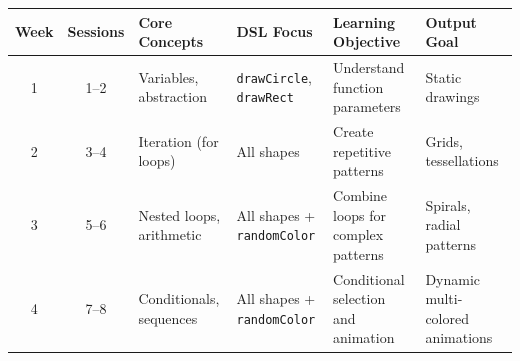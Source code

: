 \begin{table}
\centering

\begin{tabular}{@{}c c m{3cm} m{3cm} m{4cm} m{3.5cm}@{}}
\toprule
\textbf{Week} & \textbf{Sessions} & \textbf{Core Concepts} & \textbf{DSL Focus} & \textbf{Learning Objective} & \textbf{Output Goal} \\
\midrule
1 & 1--2 & Variables, abstraction & \texttt{drawCircle}, \texttt{drawRect} & Understand function parameters & Static drawings \\
2 & 3--4 & Iteration (for loops) & All shapes & Create repetitive patterns & Grids, tessellations \\
3 & 5--6 & Nested loops, arithmetic & All shapes + \texttt{randomColor} & Combine loops for complex patterns & Spirals, radial patterns \\
4 & 7--8 & Conditionals, sequences & All shapes + \texttt{randomColor} & Conditional selection and animation & Dynamic multi-colored animations \\
\bottomrule
\end{tabular}

\end{table}
